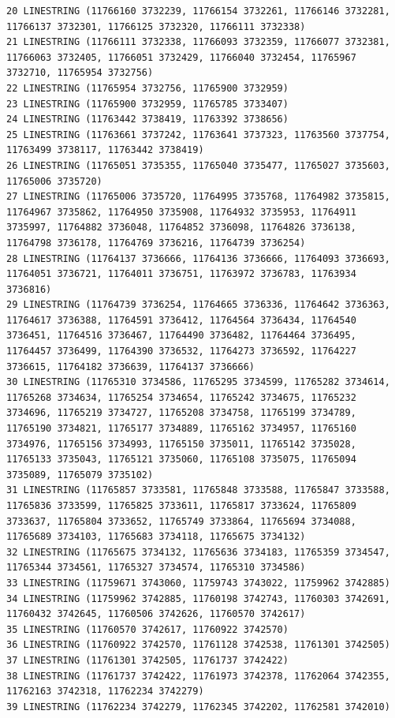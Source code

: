 \documentclass[
  letterpaper,
]{book}
\begin{document}
\begin{verbatim}
20 LINESTRING (11766160 3732239, 11766154 3732261, 11766146 3732281, 11766137 3732301, 11766125 3732320, 11766111 3732338) 
21 LINESTRING (11766111 3732338, 11766093 3732359, 11766077 3732381, 11766063 3732405, 11766051 3732429, 11766040 3732454, 11765967 3732710, 11765954 3732756) 
22 LINESTRING (11765954 3732756, 11765900 3732959) 
23 LINESTRING (11765900 3732959, 11765785 3733407) 
24 LINESTRING (11763442 3738419, 11763392 3738656) 
25 LINESTRING (11763661 3737242, 11763641 3737323, 11763560 3737754, 11763499 3738117, 11763442 3738419) 
26 LINESTRING (11765051 3735355, 11765040 3735477, 11765027 3735603, 11765006 3735720) 
27 LINESTRING (11765006 3735720, 11764995 3735768, 11764982 3735815, 11764967 3735862, 11764950 3735908, 11764932 3735953, 11764911 3735997, 11764882 3736048, 11764852 3736098, 11764826 3736138, 11764798 3736178, 11764769 3736216, 11764739 3736254) 
28 LINESTRING (11764137 3736666, 11764136 3736666, 11764093 3736693, 11764051 3736721, 11764011 3736751, 11763972 3736783, 11763934 3736816) 
29 LINESTRING (11764739 3736254, 11764665 3736336, 11764642 3736363, 11764617 3736388, 11764591 3736412, 11764564 3736434, 11764540 3736451, 11764516 3736467, 11764490 3736482, 11764464 3736495, 11764457 3736499, 11764390 3736532, 11764273 3736592, 11764227 3736615, 11764182 3736639, 11764137 3736666) 
30 LINESTRING (11765310 3734586, 11765295 3734599, 11765282 3734614, 11765268 3734634, 11765254 3734654, 11765242 3734675, 11765232 3734696, 11765219 3734727, 11765208 3734758, 11765199 3734789, 11765190 3734821, 11765177 3734889, 11765162 3734957, 11765160 3734976, 11765156 3734993, 11765150 3735011, 11765142 3735028, 11765133 3735043, 11765121 3735060, 11765108 3735075, 11765094 3735089, 11765079 3735102) 
31 LINESTRING (11765857 3733581, 11765848 3733588, 11765847 3733588, 11765836 3733599, 11765825 3733611, 11765817 3733624, 11765809 3733637, 11765804 3733652, 11765749 3733864, 11765694 3734088, 11765689 3734103, 11765683 3734118, 11765675 3734132) 
32 LINESTRING (11765675 3734132, 11765636 3734183, 11765359 3734547, 11765344 3734561, 11765327 3734574, 11765310 3734586) 
33 LINESTRING (11759671 3743060, 11759743 3743022, 11759962 3742885) 
34 LINESTRING (11759962 3742885, 11760198 3742743, 11760303 3742691, 11760432 3742645, 11760506 3742626, 11760570 3742617) 
35 LINESTRING (11760570 3742617, 11760922 3742570) 
36 LINESTRING (11760922 3742570, 11761128 3742538, 11761301 3742505) 
37 LINESTRING (11761301 3742505, 11761737 3742422) 
38 LINESTRING (11761737 3742422, 11761973 3742378, 11762064 3742355, 11762163 3742318, 11762234 3742279) 
39 LINESTRING (11762234 3742279, 11762345 3742202, 11762581 3742010) 

\end{verbatim}
\end{document}
